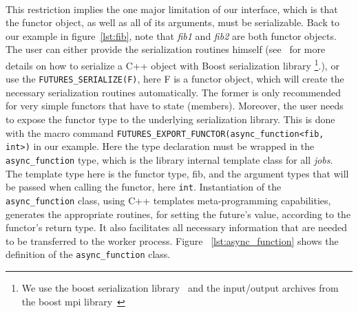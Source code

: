 \paragraph{}
This restriction
implies the one major limitation of our interface, which is that the functor object, as well as all of its arguments,
must be serializable.  Back to our example in figure~\ref{lst:fib}, note that \emph{fib1} and \emph{fib2} are both
functor objects.  The user can either provide the serialization routines himself (see~\cite{Ramey:2004:Boost:Serialization} 
for more details on how to serialize a C++ object with Boost serialization library
\footnote{We use the boost serialization library~\cite{Ramey:2004:Boost:Serialization} 
and the input/output archives from the boost mpi library~\cite{Gregor:2005:Boost:MPI}}.), or use the \texttt{FUTURES\_SERIALIZE(F)},
here F is a functor object, which will create the necessary serialization routines automatically.  The former is only 
recommended for very simple functors that have to state (members).  Moreover, the user needs to expose the functor 
type to the underlying serialization library.  This is done with the macro command 
\texttt{FUTURES\_EXPORT\_FUNCTOR(async\_function<fib, int>)} in our example.  Here the type declaration must be wrapped in the
\texttt{async\_function} type, which is the library internal template class for all \emph{jobs}.  The template type 
here is the functor type, fib, and the argument types that will be passed when calling the functor, here \texttt{int}. 
Instantiation of the \texttt{async\_function} class, using C++ templates meta-programming capabilities,
generates the appropriate routines, for setting the future's value, according to the functor's return type.
It also facilitates all necessary information that are needed to be transferred to the worker process.
Figure ~\ref{lst:async_function} shows the definition of the \texttt{async\_function} class.

